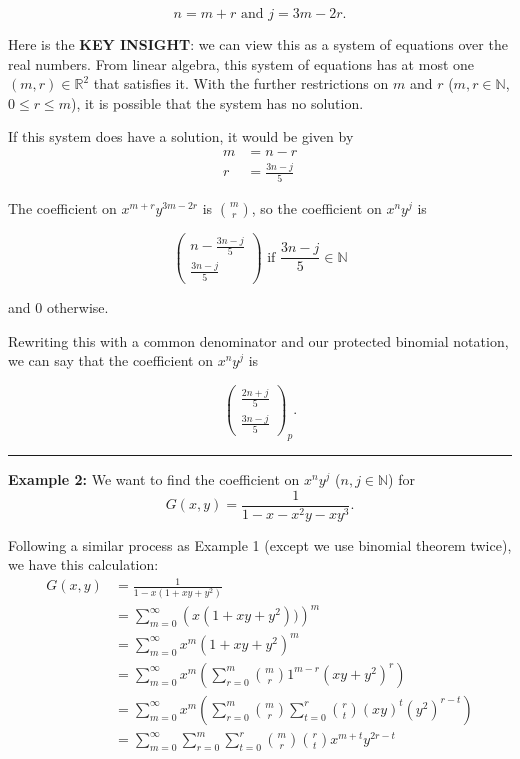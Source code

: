\documentclass[11pt]{article}
\newcommand{\tallbinom}[2]{\left( \begin{array}{c} {#1} \\[8pt] {#2} \end{array} \right)}
\begin{document}
\[
n = m + r \text{ and } j = 3m - 2r.
\]

Here is the \textbf{KEY INSIGHT}: we can view this as a system of equations over the real numbers. From linear algebra, this system of equations has at most one $(m,r) \in \mathbb{R}^2$ that satisfies it. With the further restrictions on $m$ and $r$ ($m, r \in \mathbb{N}$, $0 \leq r \leq m$), it is possible that the system has no solution. 

If this system does have a solution, it would be given by 
\begin{align*}
m &= n - r \\
r &= \displaystyle\frac{3n - j}{5} 
\end{align*}

The coefficient on $x^{m+r} y^{3m - 2r}$ is $\binom{m}{r}$, so the coefficient on $x^n y^j$ is 

\[
\tallbinom{n - \frac{3n - j}{5}}{\frac{3n - j}{5}} \text{ if } \frac{3n - j}{5} \in\mathbb{N}
\]

and 0 otherwise. 

Rewriting this with a common denominator and our protected binomial notation, we can say that the coefficient on $x^n y^j$ is

\[
\tallbinom{\frac{2n+j}{5}}{\frac{3n-j}{5}}_p.
\]

\hrule

\textbf{Example 2:} We want to find the coefficient on $x^n y^j$ ($n, j \in \mathbb{N}$) for 
\[
G(x,y) = \displaystyle\frac{1}{1 - x - x^2y - xy^3}. 
\]

Following a similar process as Example 1 (except we use binomial theorem twice), we have this calculation: \\

\begin{align*}
G(x,y) &= \displaystyle\frac{1}{1 - x(1 + xy + y^2)} \\
&= \displaystyle\sum_{m = 0}^\infty \left( x (1+ xy + y^2)) \right)^m \\
&= \displaystyle\sum_{m = 0}^\infty x^m \left(1 + xy + y^2 \right)^m \\
&= \displaystyle\sum_{m = 0}^\infty x^m  \left( \displaystyle\sum_{r=0}^m \binom{m}{r} 1^{m-r} (xy + y^2)^r \right) \\
&= \displaystyle\sum_{m = 0}^\infty x^m \left( \displaystyle\sum_{r = 0}^m \binom{m}{r} \displaystyle\sum_{t = 0}^r \binom{r}{t} (xy)^t (y^2)^{r-t}  \right) \\
&= \displaystyle\sum_{m = 0}^\infty \displaystyle\sum_{r = 0}^m \displaystyle\sum_{t = 0}^r \binom{m}{r} \binom{r}{t} x^{m+t} y^{2r - t} \\
\end{align*}
\end{document}
